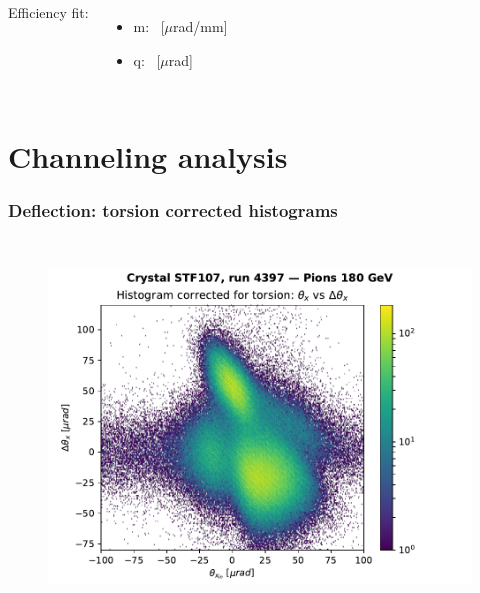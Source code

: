 \documentclass[10pt]{beamer}
\begin{document}
\begin{frame}
\begin{columns}[t]
Efficiency fit:
\begin{itemize}[leftmargin=*]
 \item m: \torsionm\ [$\mu$rad/mm]
 \item q: \torsionq\ [$\mu$rad]
\end{itemize}


\end{columns}
\end{frame}


\section{Channeling analysis}

\begin{frame}
\frametitle{Deflection: torsion corrected histograms}

\begin{columns}[c] %

\begin{figure}
\includegraphics[width=0.9\linewidth]{corrected_histo.pdf}\\
\end{figure}


\end{columns}
\end{frame}
\end{document}
